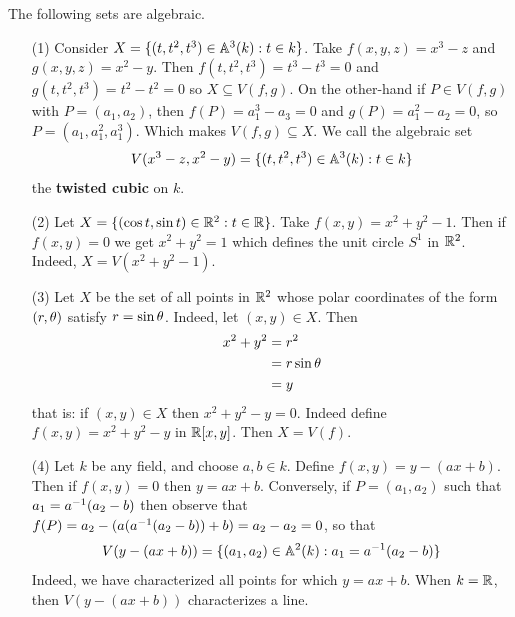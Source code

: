 \begin{example}\label{example_10.2}
  The following sets are algebraic.
  \begin{enumerate}
    \item[(1)] Consider $X=\{(t, t^2, t^3) \in \mathbb{A}^3(k) : t \in k\}$.
      Take $f(x,y,z)=x^3-z$ and $g(x,y,z)=x^2-y$. Then
      $f(t,t^2,t^3)=t^3-t^3=0$ and $g(t,t^2,t^3)=t^2-t^2=0$ so
      $X \subseteq V(f,g)$. On the other-hand if $P \in V(f,g)$ with
      $P=(a_1, a_2)$, then $f(P)=a_1^3-a_3=0$ and $g(P)=a_1^2-a_2=0$, so
      $P=(a_1, a_1^2, a_1^3)$. Which makes $V(f,g) \subseteq X$. We call
      the algebraic set
      \begin{equation*}
        V(x^3-z,x^2-y)=\{(t,t^2,t^3) \in \mathbb{A}^3(k): t \in k\}
      \end{equation*}
      the \textbf{twisted cubic} on $k$.

    \item[(2)] Let $X=\{(\cos{t}, \sin{t}) \in \mathbb{R}^2 : t \in \mathbb{R}\}$.
      Take $f(x,y)=x^2+y^2-1$. Then if $f(x,y)=0$ we get $x^2+y^2=1$
      which defines the unit circle $S^1$ in $\mathbb{R}^2$. Indeed,
      $X=V(x^2+y^2-1)$.

    \item[(3)] Let $X$ be the set of all points in $\mathbb{R}^2$ whose polar
      coordinates of the form $(r,\theta)$ satisfy $r=\sin{\theta}$. Indeed,
      let $(x,y) \in X$. Then
      \begin{align*}
        x^2+y^2 &= r^2 \\
        &= r\sin{\theta} \\
        &= y \\
      \end{align*}
      that is: if $(x,y) \in X$ then $x^2+y^2-y=0$. Indeed define
      $f(x,y)=x^2+y^2-y$ in $\mathbb{R}[x,y]$. Then $X=V(f)$.

    \item[(4)] Let $k$ be any field, and choose $a,b \in k$. Define
      $f(x,y)=y-(ax+b)$. Then if $f(x,y)=0$ then $y=ax+b$. Conversely,
      if $P=(a_1, a_2)$ such that $a_1=a^{-1}(a_2-b)$ then observe
      that $f(P)=a_2-(a(a^{-1}(a_2-b))+b)=a_2-a_2=0$, so that
      \begin{equation*}
        V(y-(ax+b))=\{(a_1,a_2) \in \mathbb{A}^2(k) : a_1=a^{-1}(a_2-b)\}
      \end{equation*}
      Indeed, we have characterized all points for which $y=ax+b$.
      When $k=\mathbb{R}$, then $V(y-(ax+b))$ characterizes a line.
  \end{enumerate}
\end{example}

